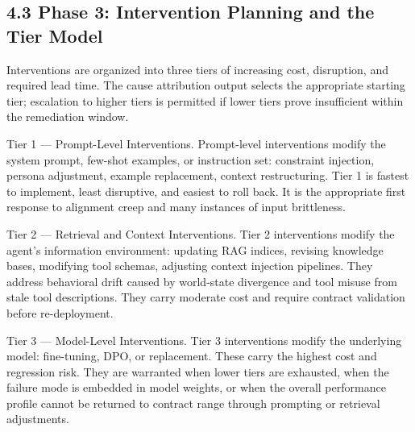 \subsection{4.3  Phase 3: Intervention Planning and the Tier Model}

Interventions are organized into three tiers of increasing cost, disruption, and required lead time. The cause attribution output selects the appropriate starting tier; escalation to higher tiers is permitted if lower tiers prove insufficient within the remediation window.

Tier 1 --- Prompt-Level Interventions. Prompt-level interventions modify the system prompt, few-shot examples, or instruction set: constraint injection, persona adjustment, example replacement, context restructuring. Tier 1 is fastest to implement, least disruptive, and easiest to roll back. It is the appropriate first response to alignment creep and many instances of input brittleness.

Tier 2 --- Retrieval and Context Interventions. Tier 2 interventions modify the agent's information environment: updating RAG indices, revising knowledge bases, modifying tool schemas, adjusting context injection pipelines. They address behavioral drift caused by world-state divergence and tool misuse from stale tool descriptions. They carry moderate cost and require contract validation before re-deployment.

Tier 3 --- Model-Level Interventions. Tier 3 interventions modify the underlying model: fine-tuning, DPO, or replacement. These carry the highest cost and regression risk. They are warranted when lower tiers are exhausted, when the failure mode is embedded in model weights, or when the overall performance profile cannot be returned to contract range through prompting or retrieval adjustments.

